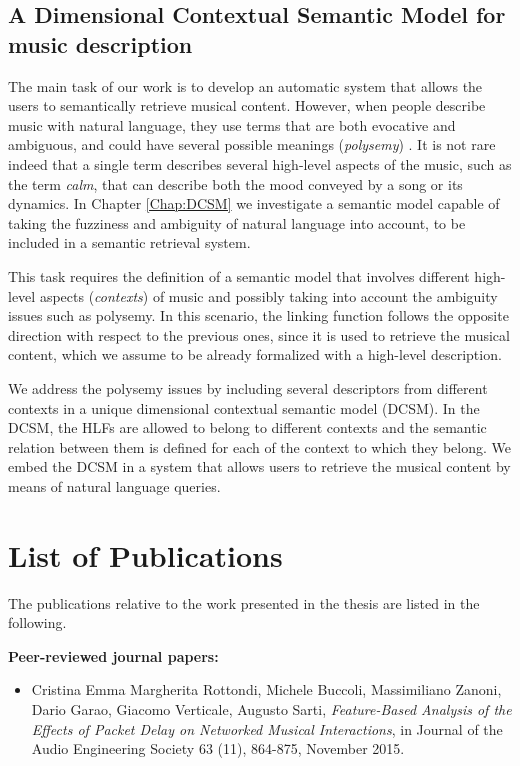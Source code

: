 \subsection{A Dimensional Contextual Semantic Model for music description}
The main task of our work is to develop an automatic system that allows the users to semantically retrieve  musical content. However, when people describe music with natural language, they use terms that are both evocative and ambiguous, and could have several possible meanings (\textit{polysemy}) \cite{lee1999}. It is not rare indeed that a single term describes several high-level aspects of the music, such as the term \textit{calm}, that can describe both the mood conveyed by a song or its dynamics. In Chapter \ref{Chap:DCSM} we investigate a semantic model capable of taking the fuzziness and ambiguity of natural language into account, to be included in a semantic retrieval system. 

This task requires the definition of a semantic model that involves different high-level aspects (\textit{contexts}) of music and possibly taking into account the ambiguity issues such as polysemy. 
In this scenario, the linking function follows the opposite direction with respect to the previous ones, since it is used to retrieve the musical content, which we assume to be already formalized with a high-level description.

We address the polysemy issues by including several descriptors from different contexts in a unique dimensional contextual semantic model (DCSM). In the DCSM, the HLFs are allowed to belong to different contexts and the semantic relation between them is defined for each of the context to which they belong. We embed the DCSM in a system that allows users to retrieve the musical content by means of natural language queries.

\section{List of Publications}
The publications relative to the work presented in the thesis are listed in the following.


\textbf{Peer-reviewed journal papers:}
\begin{itemize}
\item Cristina Emma Margherita Rottondi, Michele Buccoli, Massimiliano Zanoni, Dario Garao, Giacomo Verticale, Augusto Sarti, \textit{Feature-Based Analysis of the Effects of Packet Delay on Networked Musical Interactions}, in Journal of the Audio Engineering Society 63 (11), 864-875, November 2015.	
\end{itemize}

